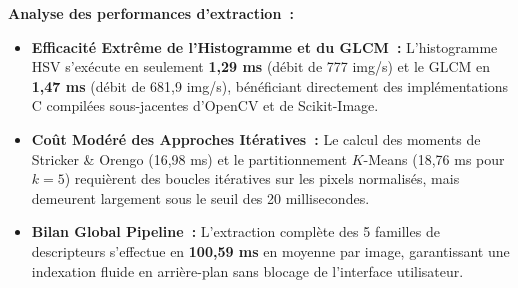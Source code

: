 \begin{table}[H]
\centering
{}
\caption{Latences computationnelles réelles et débit d'extraction des signatures visuelles}
\label{tab:bench_descriptors}
\end{table}

\noindent\textbf{Analyse des performances d'extraction~:}
\begin{itemize}
    \item \textbf{Efficacité Extrême de l'Histogramme et du GLCM~:} L'histogramme HSV s'exécute en seulement \textbf{1,29 ms} (débit de 777 img/s) et le GLCM en \textbf{1,47 ms} (débit de 681,9 img/s), bénéficiant directement des implémentations C compilées sous-jacentes d'OpenCV et de Scikit-Image.
    \item \textbf{Coût Modéré des Approches Itératives~:} Le calcul des moments de Stricker \& Orengo (16,98 ms) et le partitionnement $K$-Means (18,76 ms pour $k=5$) requièrent des boucles itératives sur les pixels normalisés, mais demeurent largement sous le seuil des 20 millisecondes.
    \item \textbf{Bilan Global Pipeline~:} L'extraction complète des 5 familles de descripteurs s'effectue en \textbf{100,59 ms} en moyenne par image, garantissant une indexation fluide en arrière-plan sans blocage de l'interface utilisateur.
\end{itemize}

